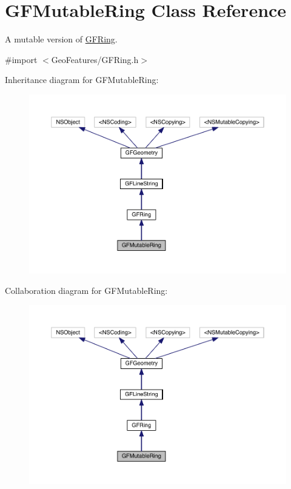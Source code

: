\hypertarget{interface_g_f_mutable_ring}{}\section{G\+F\+Mutable\+Ring Class Reference}
\label{interface_g_f_mutable_ring}


A mutable version of \hyperlink{interface_g_f_ring}{G\+F\+Ring}.  




{\ttfamily \#import $<$Geo\+Features/\+G\+F\+Ring.\+h$>$}



Inheritance diagram for G\+F\+Mutable\+Ring\+:\nopagebreak
\begin{figure}[H]
\begin{center}
\leavevmode
\includegraphics[width=350pt]{interface_g_f_mutable_ring__inherit__graph}
\end{center}
\end{figure}


Collaboration diagram for G\+F\+Mutable\+Ring\+:\nopagebreak
\begin{figure}[H]
\begin{center}
\leavevmode
\includegraphics[width=350pt]{interface_g_f_mutable_ring__coll__graph}
\end{center}
\end{figure}
